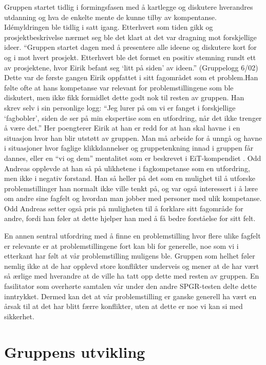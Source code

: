 \documentclass[a4paper,norsk,oneside]{article}
\begin{document}
Gruppen startet tidlig i formingsfasen med å kartlegge og diskutere hverandres utdanning og hva de enkelte mente de kunne tilby av kompentanse. Idémyldringen ble tidlig i satt igang. Etterhvert som tiden gikk og prosjektbeskrivelse nærmet seg ble det klart at det var dragning mot forskjellige ideer. “Gruppen startet dagen med å presentere alle ideene og diskutere kort for og i mot hvert prosjekt. Etterhvert ble det formet en positiv stemning rundt ett av prosjektene, hvor Eirik befant seg ‘litt på siden’ av ideen.” (Gruppelogg 6/02) Dette var de første gangen Eirik oppfattet i sitt fagområdet som et problem.Han følte ofte at hans kompetanse var relevant for problemstillingene som ble diskutert, men ikke fikk formidlet dette godt nok til resten av gruppen. Han skrev selv i sin personlige logg: “Jeg lurer på om vi er fanget i forskjellige ‘fagbobler’, siden de ser på min ekspertise som en utfordring, når det ikke trenger å være det.”  Her poengterer Eirik at han er redd for at han skal havne i en situasjon hvor han blir utstøtt av gruppen. Man må arbeide for å unngå og havne i situasjoner hvor faglige klikkdannelser og gruppetenkning innad i gruppen får dannes, eller en “vi og dem” mentalitet som er beskrevet i EiT-kompendiet \cite{johnson2008joining}. Odd Andreas opplevde at han så på ulikhetene i fagkompetanse som en utfordring, men ikke i negativ forstand. Han så heller på det som en mulighet til å utforske problemstillinger han normalt ikke ville tenkt på, og var også interessert i å lære om andre sine fagfelt og hvordan man jobber med personer med ulik kompetanse. Odd Andreas setter også pris på muligheten til å forklare sitt fagområde for andre, fordi han føler at dette hjelper han med å få bedre forståelse for sitt felt.

En annen sentral utfordring med å finne en problemstilling hvor flere ulike fagfelt er relevante er at problemstillingene fort kan bli for generelle, noe som vi i etterkant har følt at vår problemstilling muligens ble. Gruppen som helhet føler nemlig ikke at de har opplevd store konflikter underveis og mener at de har vært så ærlige med hverandre at de ville ha tatt opp dette med resten av gruppen. En fasilitator som overhørte samtalen vår under den andre SPGR-testen delte dette inntrykket. Dermed kan det at vår problemstilling er ganske generell ha vært en årsak til at det har blitt færre konflikter, uten at dette er noe vi kan si med sikkerhet.

\section{Gruppens utvikling}
\end{document}

